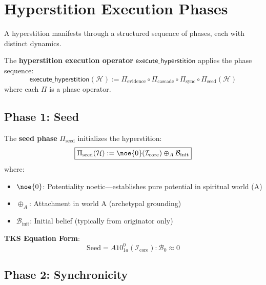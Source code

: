 \section{Hyperstition Execution Phases}
\label{sec:execute-hyperstition}

A hyperstition manifests through a structured sequence of phases, each with distinct dynamics.

\begin{definition}
\label{def:execute-hyperstition}
The \textbf{hyperstition execution operator} $\mathsf{execute\_hyperstition}$ applies the phase sequence:
\[
\mathsf{execute\_hyperstition}(\mathcal{H}) := \Pi_{\text{evidence}} \circ \Pi_{\text{cascade}} \circ \Pi_{\text{sync}} \circ \Pi_{\text{seed}}(\mathcal{H})
\]
where each $\Pi$ is a phase operator.
\end{definition}

\subsection{Phase 1: Seed}

\begin{definition}
\label{def:seed-phase}
The \textbf{seed phase} $\Pi_{\text{seed}}$ initializes the hyperstition:
\begin{equation}
\boxed{
\Pi_{\text{seed}}(\mathcal{H}) := \noe{0}(\mathcal{I}_{\text{core}}) \oplus_A \mathcal{B}_{\text{init}}
}
\end{equation}
where:
\begin{itemize}
    \item $\noe{0}$: Potentiality noetic---establishes pure potential in spiritual world (A)
    \item $\oplus_A$: Attachment in world A (archetypal grounding)
    \item $\mathcal{B}_{\text{init}}$: Initial belief (typically from originator only)
\end{itemize}
\textbf{TKS Equation Form}:
\[
\text{Seed} = A10^0_{1a}(\mathcal{I}_{\text{core}}) : \mathcal{B}_0 \approx 0
\]
\end{definition}

\subsection{Phase 2: Synchronicity}

